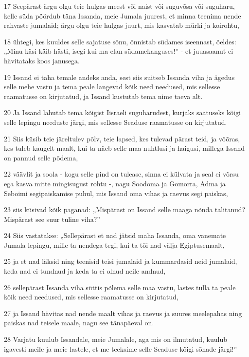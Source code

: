 \par 17 Seepärast ärgu olgu teie hulgas meest või naist või suguvõsa või suguharu, kelle süda pöördub täna Issanda, meie Jumala juurest, et minna teenima nende rahvaste jumalaid; ärgu olgu teie hulgas juurt, mis kasvatab mürki ja koirohtu,
\par 18 ühtegi, kes kuuldes selle sajatuse sõnu, õnnistab südames iseennast, öeldes: „Minu käsi käib hästi, isegi kui ma elan südamekanguses!” - et juuasaanut ei hävitataks koos janusega.
\par 19 Issand ei taha temale andeks anda, sest siis suitseb Issanda viha ja ägedus selle mehe vastu ja tema peale langevad kõik need needused, mis sellesse raamatusse on kirjutatud, ja Issand kustutab tema nime taeva alt.
\par 20 Ja Issand lahutab tema kõigist Iisraeli suguharudest, kurjaks saatuseks kõigi selle lepingu needuste järgi, mis sellesse Seaduse raamatusse on kirjutatud.
\par 21 Siis küsib teie järeltulev põlv, teie lapsed, kes tulevad pärast teid, ja võõras, kes tuleb kaugelt maalt, kui ta näeb selle maa nuhtlusi ja haigusi, millega Issand on pannud selle põdema,
\par 22 väävlit ja soola - kogu selle pind on tulease, sinna ei külvata ja seal ei võrsu ega kasva mitte mingisugust rohtu -, nagu Soodoma ja Gomorra, Adma ja Seboimi segipaiskamise puhul, mis Issand oma vihas ja raevus segi paiskas,
\par 23 siis küsivad kõik paganad: „Mispärast on Issand selle maaga nõnda talitanud? Mispärast see suur tuline viha?”
\par 24 Siis vastatakse: „Sellepärast et nad jätsid maha Issanda, oma vanemate Jumala lepingu, mille ta nendega tegi, kui ta tõi nad välja Egiptusemaalt,
\par 25 ja et nad läksid ning teenisid teisi jumalaid ja kummardasid neid jumalaid, keda nad ei tundnud ja keda ta ei olnud neile andnud,
\par 26 sellepärast Issanda viha süttis põlema selle maa vastu, lastes tulla ta peale kõik need needused, mis sellesse raamatusse on kirjutatud,
\par 27 ja Issand hävitas nad nende maalt vihas ja raevus ja suures meelepahas ning paiskas nad teisele maale, nagu see tänapäeval on.
\par 28 Varjatu kuulub Issandale, meie Jumalale, aga mis on ilmutatud, kuulub igavesti meile ja meie lastele, et me teeksime selle Seaduse kõigi sõnade järgi!”

